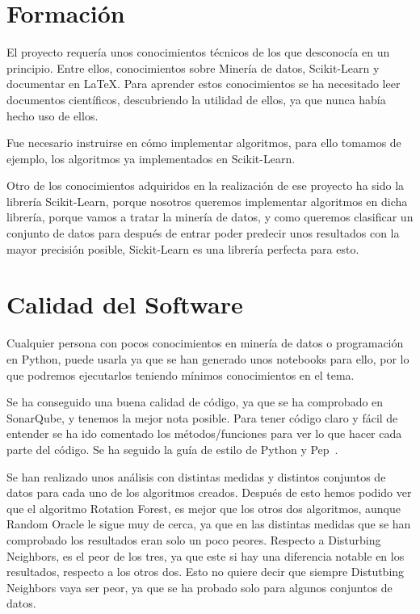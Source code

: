 
\section{Formación}
El proyecto requería unos conocimientos técnicos de los que desconocía en un principio. Entre ellos, conocimientos sobre Minería de datos, Scikit-Learn y documentar en \LaTeX. Para aprender estos conocimientos se ha necesitado leer documentos científicos, descubriendo la utilidad de ellos, ya que nunca había hecho uso de ellos.

Fue necesario instruirse en cómo implementar algoritmos, para ello tomamos de ejemplo, los algoritmos ya implementados en Scikit-Learn.

Otro de los conocimientos adquiridos en la realización de ese proyecto ha sido la librería Scikit-Learn, porque nosotros queremos implementar algoritmos en dicha librería, porque vamos a tratar la minería de datos, y como queremos clasificar un conjunto de datos para después de entrar poder predecir unos resultados con la mayor precisión posible, Sickit-Learn es una librería perfecta para esto. 

\section{Calidad del Software}
Cualquier persona con pocos conocimientos en minería de datos o programación en Python, puede usarla ya que se han generado unos notebooks para ello, por lo que podremos ejecutarlos teniendo mínimos conocimientos en el tema.

Se ha conseguido una buena calidad de código, ya que se ha comprobado en SonarQube, y tenemos la mejor nota posible. Para tener código claro y fácil de entender se ha ido comentado los métodos/funciones para ver lo que hacer cada parte del código. Se ha seguido la guía de estilo de Python y Pep~\cite{pep}.

Se han realizado unos análisis con distintas medidas y distintos conjuntos de datos para cada uno de los algoritmos creados. Después de esto hemos podido ver que el algoritmo Rotation Forest, es mejor que los otros dos algoritmos, aunque Random Oracle le sigue muy de cerca, ya que en las distintas medidas que se han comprobado los resultados eran solo un poco peores. Respecto a Disturbing Neighbors, es el peor de los tres, ya que este si hay una diferencia notable en los resultados, respecto a los otros dos. Esto no quiere decir que siempre Distutbing Neighbors vaya ser peor, ya que se ha probado solo para algunos conjuntos de datos.